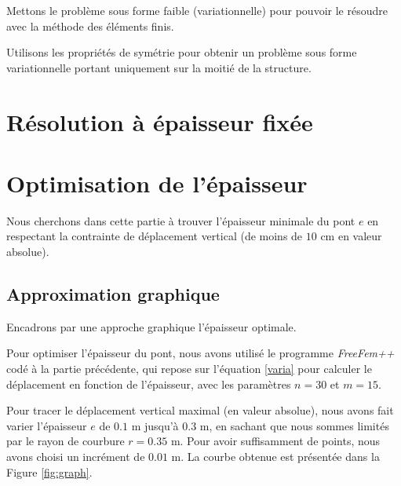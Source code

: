 \documentclass{article}
\begin{document}
    \begin{problem}{1}
    Mettons le problème sous forme faible (variationnelle) pour pouvoir le résoudre avec la méthode des éléments finis.
    \end{problem}
      
    
    

    \begin{problem}{2}
    Utilisons les propriétés de symétrie pour obtenir un problème sous forme variationnelle portant uniquement sur la moitié de la structure.
    \end{problem}
    
    

    \section{Résolution à épaisseur fixée}
        

    \section{Optimisation de l'épaisseur}
    Nous cherchons dans cette partie à trouver l'épaisseur minimale du pont $e$ en respectant la contrainte de déplacement vertical (de moins de $10$ cm en valeur absolue).

    \subsection{Approximation graphique}
    \begin{problem}{5}
        Encadrons par une approche graphique l'épaisseur optimale.
    \end{problem}
    Pour optimiser l'épaisseur du pont,
     nous avons utilisé le programme \emph{FreeFem++} codé à la partie précédente,
     qui repose sur l'équation \ref{varia} pour calculer le déplacement en fonction de l'épaisseur, avec les paramètres $n=30$ et $m=15$.

    Pour tracer le déplacement vertical maximal (en valeur absolue),
    nous avons fait varier l'épaisseur $e$
    de $0.1$ m jusqu'à $0.3$ m, en sachant que nous sommes limités par le rayon de courbure $r = 0.35$ m.
    Pour avoir suffisamment de points, nous avons choisi un incrément de $0.01$ m.
    La courbe obtenue est présentée dans la Figure \ref{fig:graph}.
\end{document}
